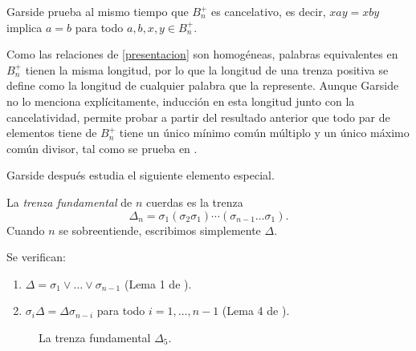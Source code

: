 \documentclass[TFG.tex]{subfiles}
\begin{document}
Garside prueba al mismo tiempo que $B_n^+$ es cancelativo, es decir, $xay=xby$ implica $a=b$ para todo $a,b,x,y\in B_n^+$.

Como las relaciones de \ref{presentacion} son homogéneas, palabras equivalentes en $B_n^+$ tienen la misma longitud, por lo que la longitud de una trenza positiva se define como la longitud de cualquier palabra que la represente. Aunque Garside no lo menciona explícitamente, inducción en esta longitud junto con la cancelatividad, permite probar a partir del resultado anterior que todo par de elementos tiene de $B_n^+$ tiene un único mínimo común múltiplo y un único máximo común divisor, tal como se prueba en \cite{Dehornoy}. 

Garside después estudia el siguiente elemento especial.
\begin{defi}
La \emph{trenza fundamental} de $n$ cuerdas es la trenza
$$\Delta_n=\sigma_1(\sigma_2\sigma_1)\cdots(\sigma_{n-1}\dots\sigma_1).$$
Cuando $n$ se sobreentiende, escribimos simplemente $\Delta$. 
\end{defi} 
\newpage
\begin{prop}\label{conjuga}
Se verifican: 
\begin{enumerate}
\item $\Delta=\sigma_1\lor\dots\lor\sigma_{n-1}$ (Lema 1 de \cite{Garside}).
\item $\sigma_i\Delta=\Delta\sigma_{n-i}$ para todo $i=1,\dots, n-1$ (Lema 4 de \cite{Garside}).
\end{enumerate}
\end{prop} 


\begin{figure}[h!]
\centering
{}
\caption{La trenza fundamental $\Delta_5$.}
\end{figure}
\end{document}
